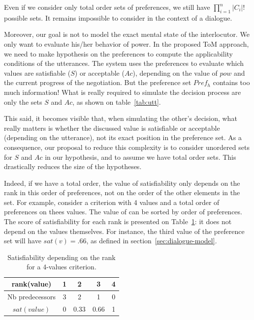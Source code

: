 \documentclass[sigconf]{aamas}  %
\begin{document}
	Even if we consider only total order sets of preferences, we still have  $\prod_{i=1}^n |C_i|!$ possible sets. It remains impossible to consider in the context of a dialogue.
	
	Moreover, our goal is not to model the exact mental state of the interlocutor. We only want to evaluate his/her behavior of power. In the proposed ToM approach, we need to make hypothesis on the preferences to compute the applicability conditions of the utterances. The system uses the preferences to evaluate which values are satisfiable ($S$) or acceptable ($Ac$), depending on the value of $pow$ and the current progress of the negotiation. But the preference set $Pref_h$ contains too much information! What is really required to simulate the decision process are only the sets $S$ and $Ac$, as shown on table~\ref{tab:utt}.
	
	This said, it becomes visible that, when simulating the other's decision, what really matters is whether the discussed value is satisfiable or acceptable (depending on the utterance), not its exact position in the preference set. As a consequence, our proposal to reduce this complexity is to consider unordered sets for $S$ and $Ac$ in our hypothesis, and to assume we have total order sets. This drastically reduces the size of the hypotheses.
	
	Indeed, if we have a total order, the value of satisfiability only depends on the rank in this order of preferences, not on the order of the other elements in the set. For example, consider a criterion with 4 values and a total order of preferences on thees values. The value of can be sorted by order of preferences. The score of satisfiability for each rank is presented on Table~\ref{tab:poss}: it does not depend on the values themselves. For instance, the third value of the preference set will have $sat(v)=.66$, as defined in section~\ref{sec:dialogue-model}.
		\begin{table}[h]
			\caption{Satisfiability depending on the rank for a 4-values criterion.}
			\label{tab:poss}
			\centering
			\begin{tabular}{ |c|c|c|c|c| }
				\hline				
				rank(value) & 1 & 2 & 3 & 4 \\
				\hline
				Nb predecessors & 3 & 2 & 1& 0 \\
				\hline
				$sat(value)$ & 0 & 0.33 & 0.66 &1 \\
				\hline
			\end{tabular}
		\end{table}
	
\end{document}
